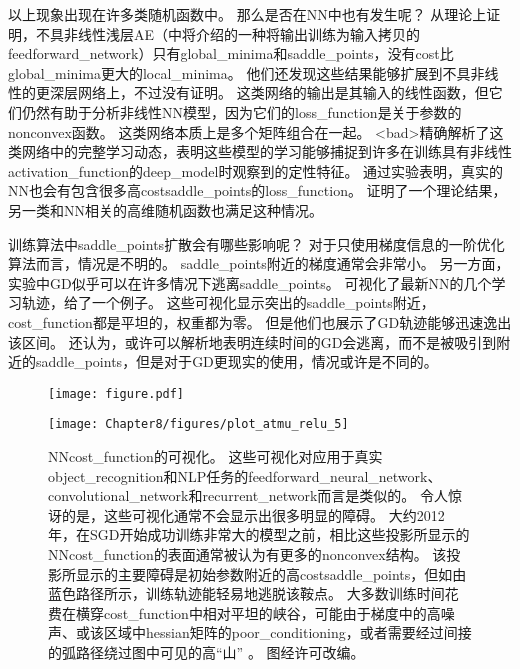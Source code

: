 以上现象出现在许多类随机函数中。
那么是否在\gls{NN}中也有发生呢？
\cite{Baldi89}从理论上证明，不具非线性浅层\gls{AE}（中将介绍的一种将输出训练为输入拷贝的\gls{feedforward_network}）只有\gls{global_minima}和\gls{saddle_points}，没有\gls{cost}比\gls{global_minima}更大的\gls{local_minima}。
他们还发现这些结果能够扩展到不具非线性的更深层网络上，不过没有证明。
这类网络的输出是其输入的线性函数，但它们仍然有助于分析非线性\gls{NN}模型，因为它们的\gls{loss_function}是关于参数的\gls{nonconvex}函数。
这类网络本质上是多个矩阵组合在一起。
<bad>\cite{Saxe-et-al-ICLR13}精确解析了这类网络中的完整学习动态，表明这些模型的学习能够捕捉到许多在训练具有非线性\gls{activation_function}的\gls{deep_model}时观察到的定性特征。
\cite{Dauphin-et-al-NIPS2014-small}通过实验表明，真实的\gls{NN}也会有包含很多高\gls{cost}\gls{saddle_points}的\gls{loss_function}。
\cite{Choromanska-et-al-AISTATS2015}证明了一个理论结果，另一类和\gls{NN}相关的高维随机函数也满足这种情况。


训练算法中\gls{saddle_points}扩散会有哪些影响呢？
对于只使用梯度信息的一阶优化算法而言，情况是不明的。
\gls{saddle_points}附近的梯度通常会非常小。
另一方面，实验中\gls{GD}似乎可以在许多情况下逃离\gls{saddle_points}。
\cite{GoodfellowOptimization15}可视化了最新\gls{NN}的几个学习轨迹，给了一个例子。
这些可视化显示突出的\gls{saddle_points}附近，\gls{cost_function}都是平坦的，权重都为零。
但是他们也展示了\gls{GD}轨迹能够迅速逸出该区间。
\cite{GoodfellowOptimization15}还认为，或许可以解析地表明连续时间的\gls{GD}会逃离，而不是被吸引到附近的\gls{saddle_points}，但是对于\gls{GD}更现实的使用，情况或许是不同的。


\begin{figure}[!htb]
\ifOpenSource
\centerline{\texttt{[image: figure.pdf]}}
\else
\centerline{\texttt{[image: Chapter8/figures/plot\_atmu\_relu\_5]}}
\fi
\caption{\gls{NN}\gls{cost_function}的可视化。
这些可视化对应用于真实\gls{object_recognition}和\gls{NLP}任务的\gls{feedforward_neural_network}、\gls{convolutional_network}和\gls{recurrent_network}而言是类似的。
令人惊讶的是，这些可视化通常不会显示出很多明显的障碍。
大约2012年，在\gls{SGD}开始成功训练非常大的模型之前，相比这些投影所显示的\gls{NN}\gls{cost_function}的表面通常被认为有更多的\gls{nonconvex}结构。
该投影所显示的主要障碍是初始参数附近的高\gls{cost}\gls{saddle_points}，但如由蓝色路径所示，训练轨迹能轻易地逃脱该鞍点。
大多数训练时间花费在横穿\gls{cost_function}中相对平坦的峡谷，可能由于梯度中的高噪声、或该区域中\gls{hessian}矩阵的\gls{poor_conditioning}，或者需要经过间接的弧路径绕过图中可见的高``山'' 。
图经\citet{GoodfellowOptimization15}许可改编。
}
\label{fig:chap8_plot_atmu_relu_5}
\end{figure}


